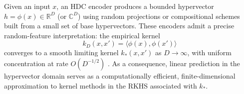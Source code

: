 Given an input $x$, an HDC encoder produces a bounded hypervector $h=\phi(x)\in\mathbb{R}^D$ (or $\mathbb{C}^D$) using random projections or compositional schemes built from a small set of base hypervectors. These encoders admit a precise random-feature interpretation: the empirical kernel
\begin{equation}
\label{eq:empirical_kernel}
k_D(x,x')=\langle \phi(x),\phi(x')\rangle
\end{equation}
converges to a smooth limiting kernel $k_\ast(x,x')$ as $D\to\infty$, with uniform concentration at rate $O(D^{-1/2})$ \cite{rahimi2007random,bach2015equivalence,rudi2017generalization}. As a consequence, linear prediction in the hypervector domain serves as a computationally efficient, finite-dimensional approximation to kernel methods in the RKHS associated with $k_\ast$.













